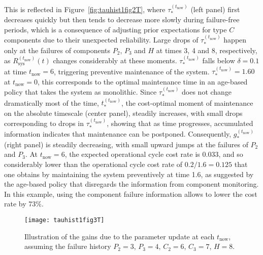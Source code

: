 \documentclass[authoryear]{elsarticle}
\def\tnow{t_\text{now}}
\newcommand{\Rsysnow}{R^{(t_\text{now})}_\text{sys}}
\newcommand{\tausnow}{\tau_*^{(\tnow)}}
\newcommand{\tstarnow}{t_*^{(\tnow)}}
\newcommand{\gstarnow}{g_*^{(\tnow)}}
\begin{document}
This is reflected in Figure~\ref{fig:tauhist1fig2T},
where $\tausnow$ (left panel) first decreases quickly but then tends to decrease more slowly during failure-free periods,
which is a consequence of adjusting prior expectations for type $C$ components
due to their unexpected reliability.
Large drops of $\tausnow$ happen only at the failures of components $P_2$, $P_3$ and $H$
at times 3, 4 and 8, respectively,
as $\Rsysnow(t)$ changes considerably at these moments.
$\tausnow$ falls below $\delta = 0.1$ at time $\tnow = 6$,
triggering preventive maintenance of the system.
$\tausnow = 1.60$ at $\tnow = 0$, this corresponds to the optimal maintenance time
in an age-based policy that takes the system as monolithic. 
Since $\tausnow$ does not change dramatically most of the time, $\tstarnow$,
the cost-optimal moment of maintenance on the absolute timescale (center panel),
steadily increases, with small drops corresponding to drops in $\tausnow$,
showing that as time progresses, accumulated information indicates that maintenance can be postponed.
Consequently, $\gstarnow$ (right panel) is steadily decreasing,
with small upward jumps at the failures of $P_2$ and $P_3$.
At $\tnow = 6$, the expected operational cycle cost rate is $0.033$,
and so considerably lower than the operational cycle cost rate of $0.2 / 1.6 = 0.125$
that one obtains by maintaining the system preventively at time 1.6,
as suggested by the age-based policy that disregards the information from component monitoring.
In this example, using the component failure information allows to lower the cost rate by 73\%.

\begin{figure}
\texttt{[image: tauhist1fig3T]}
\caption{Illustration of the gains due to the parameter update at each $\tnow$,
assuming the failure history $P_2 = 3$, $P_3 = 4$, $C_2 = 6$, $C_3 = 7$, $H = 8$.}
\label{fig:tauhist1fig3T}
\end{figure}
\end{document}
